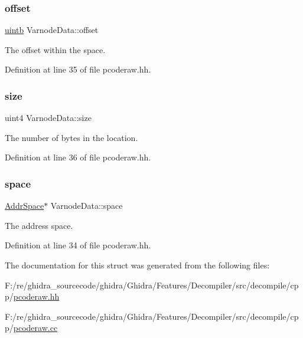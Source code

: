 \subsubsection{\texorpdfstring{offset}{offset}}
{\footnotesize\ttfamily \mbox{\hyperlink{types_8h_a2db313c5d32a12b01d26ac9b3bca178f}{uintb}} Varnode\+Data\+::offset}



The offset within the space. 



Definition at line 35 of file pcoderaw.\+hh.

\mbox{\label{struct_varnode_data_a50d39ae46d51c8854b962f3ec4ee4e25}} 
\subsubsection{\texorpdfstring{size}{size}}
{\footnotesize\ttfamily uint4 Varnode\+Data\+::size}



The number of bytes in the location. 



Definition at line 36 of file pcoderaw.\+hh.

\mbox{\label{struct_varnode_data_a1a69a5187f7a6376c0c93c08962ea68d}} 
\subsubsection{\texorpdfstring{space}{space}}
{\footnotesize\ttfamily \mbox{\hyperlink{class_addr_space}{Addr\+Space}}$\ast$ Varnode\+Data\+::space}



The address space. 



Definition at line 34 of file pcoderaw.\+hh.



The documentation for this struct was generated from the following files\+:\begin{DoxyCompactItemize}
\item 
F\+:/re/ghidra\+\_\+sourcecode/ghidra/\+Ghidra/\+Features/\+Decompiler/src/decompile/cpp/\mbox{\hyperlink{pcoderaw_8hh}{pcoderaw.\+hh}}\item 
F\+:/re/ghidra\+\_\+sourcecode/ghidra/\+Ghidra/\+Features/\+Decompiler/src/decompile/cpp/\mbox{\hyperlink{pcoderaw_8cc}{pcoderaw.\+cc}}\end{DoxyCompactItemize}
